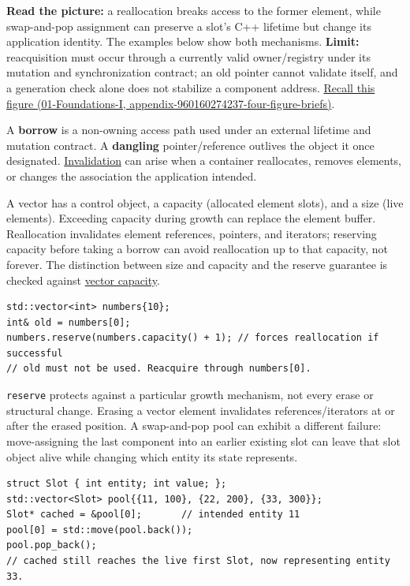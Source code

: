 \textbf{Read the picture:} a reallocation breaks access to the former element, while swap-and-pop assignment can preserve a slot's C++ lifetime but change its application identity. The examples below show both mechanisms. \textbf{Limit:} reacquisition must occur through a currently valid owner/registry under its mutation and synchronization contract; an old pointer cannot validate itself, and a generation check alone does not stabilize a component address. \href{../01-Foundations-I/main.pdf\#nameddest=appendix-960160274237-four-figure-briefs}{Recall this figure (01-Foundations-I, appendix-960160274237-four-figure-briefs)}.

A \textbf{borrow} is a non-owning access path used under an external lifetime and mutation contract. A \textbf{dangling} pointer/reference outlives the object it once designated. \hyperref[appendix-f9b8b9188c7f]{Invalidation} can arise when a container reallocates, removes elements, or changes the association the application intended.

A vector has a control object, a capacity (allocated element slots), and a size (live elements). Exceeding capacity during growth can replace the element buffer. Reallocation invalidates element references, pointers, and iterators; reserving capacity before taking a borrow can avoid reallocation up to that capacity, not forever. The distinction between size and capacity and the reserve guarantee is checked against \href{https://eel.is/c++draft/vector.capacity}{vector capacity}.

\begin{verbatim}
std::vector<int> numbers{10};
int& old = numbers[0];
numbers.reserve(numbers.capacity() + 1); // forces reallocation if successful
// old must not be used. Reacquire through numbers[0].
\end{verbatim}

\texttt{reserve} protects against a particular growth mechanism, not every erase or structural change. Erasing a vector element invalidates references/iterators at or after the erased position. A swap-and-pop pool can exhibit a different failure: move-assigning the last component into an earlier existing slot can leave that slot object alive while changing which entity its state represents.

\begin{verbatim}
struct Slot { int entity; int value; };
std::vector<Slot> pool{{11, 100}, {22, 200}, {33, 300}};
Slot* cached = &pool[0];       // intended entity 11
pool[0] = std::move(pool.back());
pool.pop_back();
// cached still reaches the live first Slot, now representing entity 33.
\end{verbatim}

